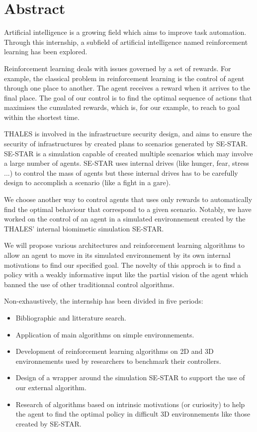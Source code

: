 \section*{Abstract}
\bigskip

Artificial intelligence is a growing field which aims to improve task automation. Through this internship, a subfield of artificial intelligence named reinforcement learning has been explored.

Reinforcement learning deals with issues governed by a set of rewards. For example, the classical problem in reinforcement learning is the control of agent through one place to another. The agent receives a reward when it arrives to the final place.  The goal of our control is to find the optimal sequence of actions that maximises the cumulated rewards, which is, for our example, to reach to goal within the shortest time.

THALES is involved in the infrastructure security design, and aims to ensure the security of infrastructures by created plans to scenarios generated by SE-STAR. 
SE-STAR is a simulation capable of created multiple scenarios which may involve a large number of agents. SE-STAR uses internal drives (like hunger, fear, stress ...) to control the mass of agents but these internal drives has to be carefully design to accomplish a scenario (like a fight in a gare).

We choose another way to control agents that uses only rewards to automatically find the optimal behaviour that correspond to a given scenario.
Notably, we have worked on the control of an agent in a simulated environnement created by the THALES' internal biomimetic simulation SE-STAR.

We will propose various architectures and reinforcement learning algorithms to allow an agent to move in its simulated environnement by its own internal motivations to find our specified goal. The novelty of this approch is to find a policy with a weakly informative input like the partial vision of the agent which banned the use of other traditionnal control algorithms. 

Non-exhaustively, the internship has been divided in five periods:

\begin{itemize}
    \item Bibliographic and litterature search.
    \item Application of main algorithms on simple environnements.
    \item Development of reinforcement learning algorithms on 2D and 3D environnements used by researchers to benchmark their controllers. 
    \item Design of a wrapper around the simulation SE-STAR to support the use of our external algorithm.
    \item Research of algorithms based on intrinsic motivations (or curiosity) to help the agent to find the optimal policy in difficult 3D environnements like those created by SE-STAR. 
\end{itemize} 

